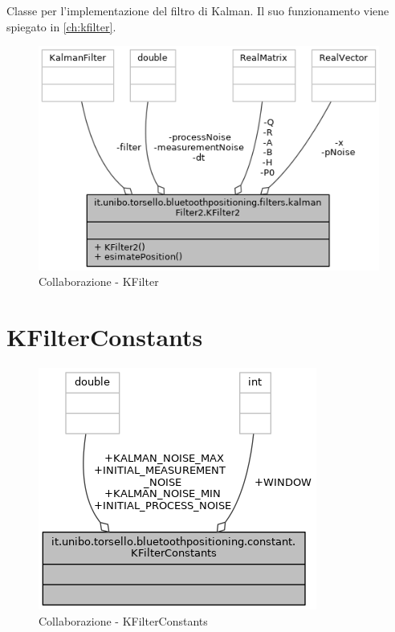Classe per l'implementazione del filtro di Kalman. Il suo funzionamento viene spiegato in \ref{ch:kfilter}.

\begin{figure}[ph]
	\centering
	\includegraphics[width=0.8\linewidth]{img/uml/class/classit_1_1unibo_1_1torsello_1_1bluetoothpositioning_1_1filters_1_1kalmanFilter2_1_1KFilter2__coll__graph.png}
	\caption{Collaborazione - KFilter}
\end{figure}

\newpage
\section{KFilterConstants}
\begin{figure}[ph]
	\centering
	\includegraphics[width=0.6\linewidth]{img/uml/class/classit_1_1unibo_1_1torsello_1_1bluetoothpositioning_1_1constant_1_1KFilterConstants__coll__graph.png}
	\caption{Collaborazione - KFilterConstants}
\end{figure}

\newpage
